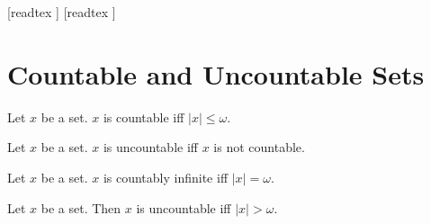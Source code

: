 \documentclass[10pt]{article}
\begin{document}
  \begin{imports}
    \begin{forthel}
      [readtex ]
      [readtex ]
    \end{forthel}
  \end{imports}


  \section*{Countable and Uncountable Sets}

  \begin{forthel}
    \begin{definition}
      Let $x$ be a set.
      $x$ is countable iff $|x| \leq \omega$.
    \end{definition}
  \end{forthel}

  \begin{forthel}
    \begin{definition}
      Let $x$ be a set.
      $x$ is uncountable iff $x$ is not countable.
    \end{definition}
  \end{forthel}

  \begin{forthel}
    \begin{definition}
      Let $x$ be a set.
      $x$ is countably infinite iff $|x| = \omega$.
    \end{definition}
  \end{forthel}

  \begin{forthel}
    \begin{proposition}
      Let $x$ be a set.
      Then $x$ is uncountable iff $|x| > \omega$.
    \end{proposition}
  \end{forthel}
\end{document}
